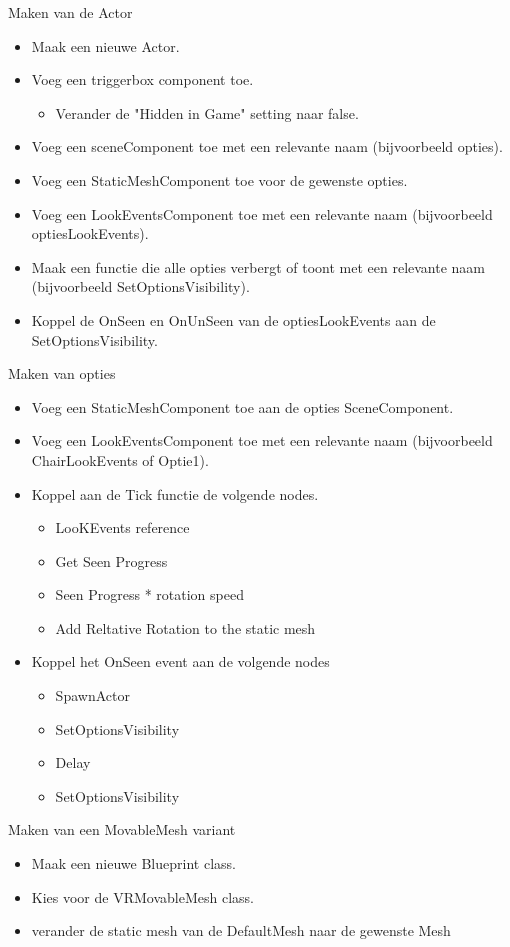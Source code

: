 Maken van de Actor
\begin{itemize}
	\item Maak een nieuwe Actor.
	\item Voeg een triggerbox component toe.
		\begin{itemize}
			\item Verander de "Hidden in Game" setting naar false.
		\end{itemize} 
	\item Voeg een sceneComponent toe met een relevante naam (bijvoorbeeld opties).
	\item Voeg een StaticMeshComponent toe voor de gewenste opties.
	\item Voeg een LookEventsComponent toe met een relevante naam (bijvoorbeeld optiesLookEvents).
	\item Maak een functie die alle opties verbergt of toont met een relevante naam (bijvoorbeeld SetOptionsVisibility).
	\item Koppel de OnSeen en OnUnSeen van de optiesLookEvents aan de SetOptionsVisibility.
\end{itemize}

Maken van opties
\begin{itemize}
	\item Voeg een StaticMeshComponent toe aan de opties SceneComponent.
	\item Voeg een LookEventsComponent toe met een relevante naam (bijvoorbeeld ChairLookEvents of Optie1).
	\item Koppel aan de Tick functie de volgende nodes.
		\begin{itemize}
			\item LooKEvents reference
			\item Get Seen Progress
			\item Seen Progress * rotation speed
			\item Add Reltative Rotation to the static mesh
		\end{itemize}
	\item Koppel het OnSeen event aan de volgende nodes
		\begin{itemize}
			\item SpawnActor
			\item SetOptionsVisibility
			\item Delay
			\item SetOptionsVisibility
		\end{itemize}
\end{itemize}

Maken van een MovableMesh variant
\begin{itemize}
	\item Maak een nieuwe Blueprint class.
	\item Kies voor de VRMovableMesh class.
	\item verander de static mesh van de DefaultMesh naar de gewenste Mesh
\end{itemize}

